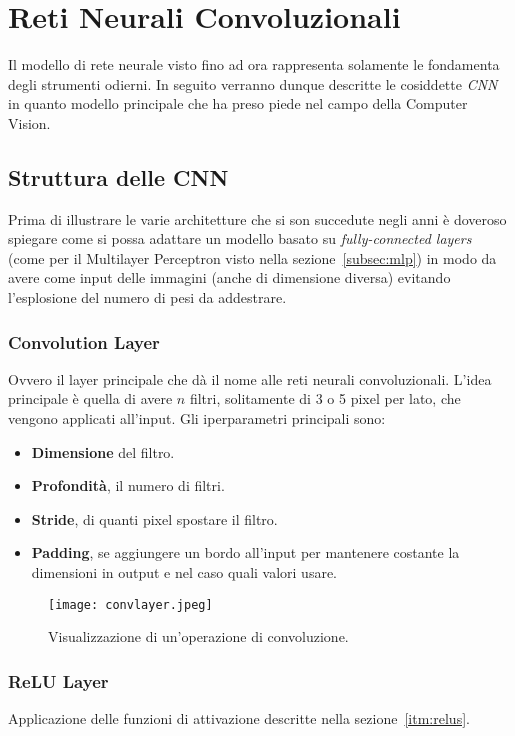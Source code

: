 \section{Reti Neurali Convoluzionali}

Il modello di rete neurale visto fino ad ora rappresenta solamente le fondamenta degli strumenti odierni.
In seguito verranno dunque descritte le cosiddette \textit{CNN} in quanto modello principale che ha preso piede nel campo della Computer Vision.

\subsection{Struttura delle CNN}

Prima di illustrare le varie architetture che si son succedute negli anni è doveroso spiegare come si possa adattare un modello basato su \textit{fully-connected layers} (come per il Multilayer Perceptron visto nella sezione~\ref{subsec:mlp}) in modo da avere come input delle immagini (anche di dimensione diversa) evitando l'esplosione del numero di pesi da addestrare.

\subsubsection{Convolution Layer}
Ovvero il layer principale che dà il nome alle reti neurali convoluzionali.
L'idea principale è quella di avere $n$ filtri, solitamente di 3 o 5 pixel per lato, che vengono applicati all'input.
Gli iperparametri principali sono:
\begin{itemize}
	\item \textbf{Dimensione} del filtro.
	\item \textbf{Profondità}, il numero di filtri.
	\item \textbf{Stride}, di quanti pixel spostare il filtro.
	\item \textbf{Padding}, se aggiungere un bordo all'input per mantenere costante la dimensioni in output e nel caso quali valori usare.
\end{itemize}
\vspace{\fill}
\begin{figure}[H]
	\centering
	\texttt{[image: convlayer.jpeg]}
	\caption{Visualizzazione di un'operazione di convoluzione.}
\label{fig:convlayer}
\end{figure}

\subsubsection{ReLU Layer}
Applicazione delle funzioni di attivazione descritte nella sezione~\ref{itm:relus}.


